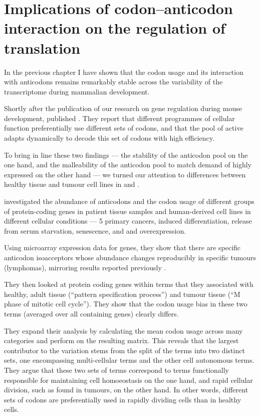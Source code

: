 \chapter{Implications of codon–anticodon interaction on the regulation of translation}


In the previous chapter I have shown that the codon usage and its interaction
with \trna anticodons remains remarkably stable across the variability of the
transcriptome during mammalian development.

Shortly after the publication of our research on \trna gene regulation during
mouse development, \citet{Gingold:2014} published . They
report that different programmes of cellular function preferentially use
different sets of codons, and that the pool of active \trna[s] adapts
dynamically to decode this set of codons with high efficiency.


To bring in line these two findings — the stability of the anticodon pool on the
one hand, and the malleability of the anticodon pool to match demand of highly
expressed on the other hand — we turned our attention to differences between
healthy tissue and tumour cell lines in \mmu and \hsa.

\citet{Gingold:2014} investigated the abundance of \trna anticodons and the
codon usage of different groups of protein-coding genes in patient tissue
samples and human-derived cell lines in different cellular conditions ---
\num{5} primary cancers, induced differentiation, release from serum starvation,
senescence, and  and  overexpression.

Using microarray expression data for \trna genes, they show that there are
specific anticodon isoacceptors whose abundance changes reproducibly in specific
tumours (lymphomas), mirroring results reported previously
\citep{Pavon-Eternod:2009}.

They then looked at protein coding genes within \go terms that they associated
with healthy, adult tissue (“pattern specification process”) and tumour tissue
(“M phase of mitotic cell cycle”). They show that the codon usage bias in these
two \go terms (averaged over all containing genes) clearly differs.

They expand their analysis by calculating the mean codon usage across many \go
categories and perform \pca on the resulting matrix. This reveals that the
largest contributor to the variation stems from the split of the \go terms into
two distinct sets, one encompassing multi-cellular \go terms and the other cell
autonomous \go terms. They argue that these two sets of \go terms correspond to
\go terms functionally responsible for maintaining cell homoeostasis on the one
hand, and rapid cellular division, such as found in tumours, on the other hand.
In other words, different sets of codons are preferentially used in rapidly
dividing cells than in healthy cells.

